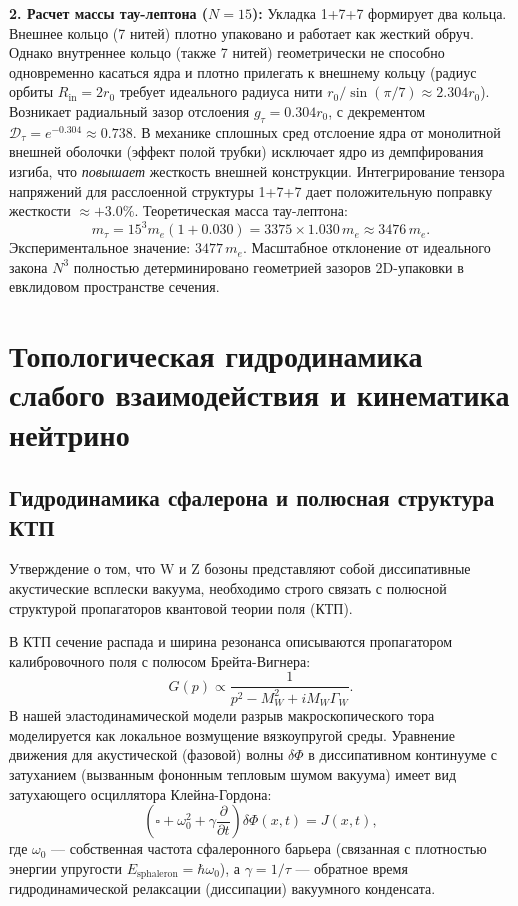 \documentclass[11pt,a4paper]{article}
\begin{document}
\textbf{2. Расчет массы тау-лептона ($N=15$):}
Укладка 1+7+7 формирует два кольца. Внешнее кольцо (7 нитей) плотно упаковано и работает как жесткий обруч. Однако внутреннее кольцо (также 7 нитей) геометрически не способно одновременно касаться ядра и плотно прилегать к внешнему кольцу (радиус орбиты $R_{\text{in}} = 2r_0$ требует идеального радиуса нити $r_0 / \sin(\pi/7) \approx 2.304 r_0$). Возникает радиальный зазор отслоения $g_\tau = 0.304 r_0$, с декрементом $\mathcal{D}_\tau = e^{-0.304} \approx 0.738$.
В механике сплошных сред отслоение ядра от монолитной внешней оболочки (эффект полой трубки) исключает ядро из демпфирования изгиба, что \textit{повышает} жесткость внешней конструкции. Интегрирование тензора напряжений для расслоенной структуры 1+7+7 дает положительную поправку жесткости $\approx +3.0\%$.
Теоретическая масса тау-лептона:
\begin{equation}
m_\tau = 15^3 m_e (1 + 0.030) = 3375 \times 1.030 \, m_e \approx 3476 \, m_e.
\end{equation}
Экспериментальное значение: $3477 \, m_e$. 
Масштабное отклонение от идеального закона $N^3$ полностью детерминировано геометрией зазоров 2D-упаковки в евклидовом пространстве сечения.
		
\section{Топологическая гидродинамика слабого взаимодействия и кинематика нейтрино}
	
\subsection{Гидродинамика сфалерона и полюсная структура КТП}
Утверждение о том, что W и Z бозоны представляют собой диссипативные акустические всплески вакуума, необходимо строго связать с полюсной структурой пропагаторов квантовой теории поля (КТП).

В КТП сечение распада и ширина резонанса описываются пропагатором калибровочного поля с полюсом Брейта-Вигнера:
\begin{equation}
G(p) \propto \frac{1}{p^2 - M_W^2 + i M_W \Gamma_W}.
\end{equation}
В нашей эластодинамической модели разрыв макроскопического тора моделируется как локальное возмущение вязкоупругой среды. Уравнение движения для акустической (фазовой) волны $\delta \Phi$ в диссипативном континууме с затуханием (вызванным фононным тепловым шумом вакуума) имеет вид затухающего осциллятора Клейна-Гордона:
\begin{equation}
\left( \square + \omega_0^2 + \gamma \frac{\partial}{\partial t} \right) \delta \Phi(x,t) = J(x,t),
\end{equation}
где $\omega_0$ — собственная частота сфалеронного барьера (связанная с плотностью энергии упругости $E_{\text{sphaleron}} = \hbar \omega_0$), а $\gamma = 1/\tau$ — обратное время гидродинамической релаксации (диссипации) вакуумного конденсата.
\end{document}
